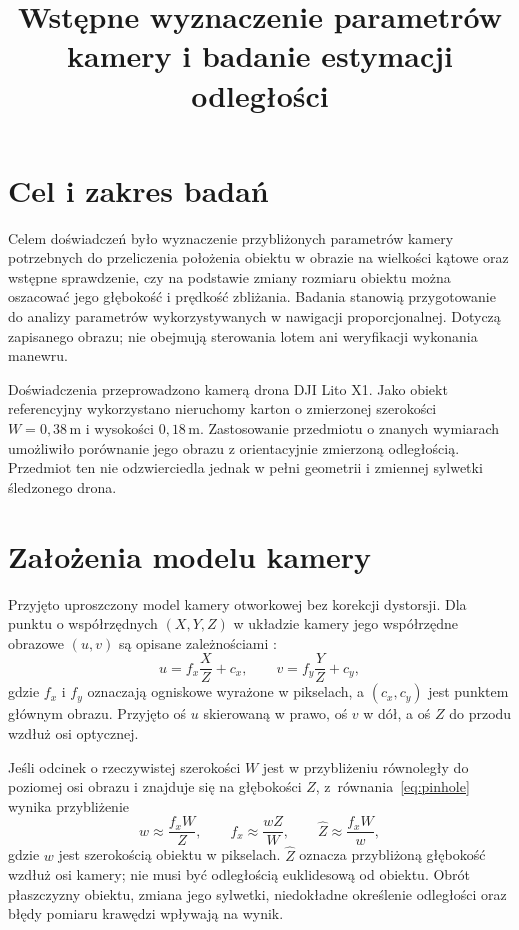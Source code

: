 \documentclass[12pt,a4paper]{article}
\title{Wstępne wyznaczenie parametrów kamery i badanie estymacji odległości}
\author{}
\date{}
\begin{document}
\maketitle

\section{Cel i zakres badań}

Celem doświadczeń było wyznaczenie przybliżonych parametrów kamery potrzebnych do przeliczenia położenia obiektu w obrazie na wielkości kątowe oraz wstępne sprawdzenie, czy na podstawie zmiany rozmiaru obiektu można oszacować jego głębokość i prędkość zbliżania. Badania stanowią przygotowanie do analizy parametrów wykorzystywanych w nawigacji proporcjonalnej. Dotyczą zapisanego obrazu; nie obejmują sterowania lotem ani weryfikacji wykonania manewru.

Doświadczenia przeprowadzono kamerą drona DJI Lito X1. Jako obiekt referencyjny wykorzystano nieruchomy karton o zmierzonej szerokości $W=0{,}38\,\mathrm{m}$ i wysokości $0{,}18\,\mathrm{m}$. Zastosowanie przedmiotu o znanych wymiarach umożliwiło porównanie jego obrazu z orientacyjnie zmierzoną odległością. Przedmiot ten nie odzwierciedla jednak w pełni geometrii i zmiennej sylwetki śledzonego drona.

\section{Założenia modelu kamery}

Przyjęto uproszczony model kamery otworkowej bez korekcji dystorsji. Dla punktu o współrzędnych $(X,Y,Z)$ w układzie kamery jego współrzędne obrazowe $(u,v)$ są opisane zależnościami \cite{opencv}:
\begin{equation}
u=f_x\frac{X}{Z}+c_x, \qquad v=f_y\frac{Y}{Z}+c_y,
\label{eq:pinhole}
\end{equation}
gdzie $f_x$ i $f_y$ oznaczają ogniskowe wyrażone w pikselach, a $(c_x,c_y)$ jest punktem głównym obrazu. Przyjęto oś $u$ skierowaną w prawo, oś $v$ w dół, a oś $Z$ do przodu wzdłuż osi optycznej.

Jeśli odcinek o rzeczywistej szerokości $W$ jest w przybliżeniu równoległy do poziomej osi obrazu i znajduje się na głębokości $Z$, z~równania~\eqref{eq:pinhole} wynika przybliżenie
\begin{equation}
w \approx \frac{f_x W}{Z},\qquad
f_x \approx \frac{wZ}{W},\qquad
\widehat Z \approx \frac{f_xW}{w},
\label{eq:distance}
\end{equation}
gdzie $w$ jest szerokością obiektu w pikselach. $\widehat Z$ oznacza przybliżoną głębokość wzdłuż osi kamery; nie musi być odległością euklidesową od obiektu. Obrót płaszczyzny obiektu, zmiana jego sylwetki, niedokładne określenie odległości oraz błędy pomiaru krawędzi wpływają na wynik.
\end{document}
